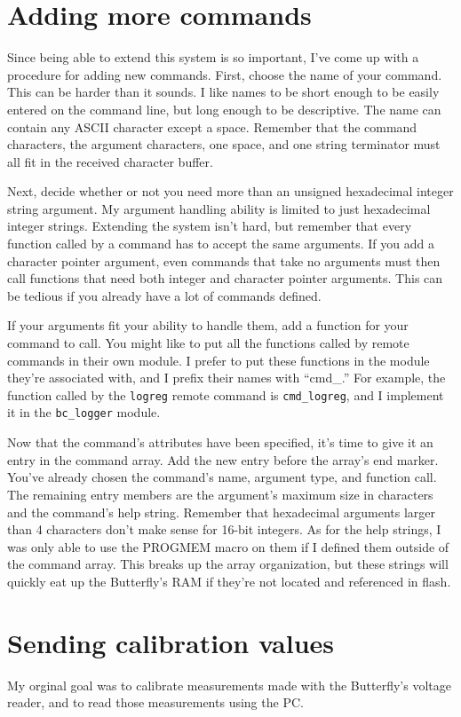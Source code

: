 \clearpage{}
\section{Adding more commands}
Since being able to extend this system is so important, I've come up with a procedure for adding new commands.  First, choose the name of your command.  This can be harder than it sounds.  I like names to be short enough to be easily entered on the command line, but long enough to be descriptive.  The name can contain any ASCII character except a space.  Remember that the command characters, the argument characters, one space, and one string terminator must all fit in the received character buffer.
    
Next, decide whether or not you need more than an unsigned hexadecimal integer string argument.  My argument handling ability is limited to just hexadecimal integer strings.  Extending the system isn't hard, but remember that every function called by a command has to accept the same arguments.  If you add a character pointer argument, even commands that take no arguments must then call functions that need both integer and character pointer arguments.  This can be tedious if you already have a lot of commands defined.

If your arguments fit your ability to handle them, add a function for your command to call.  You might like to put all the functions called by remote commands in their own module.  I prefer to put these functions in the module they're associated with, and I prefix their names with ``cmd\_.'' For example, the function called by the \texttt{logreg} remote command is \texttt{cmd\_logreg}, and I implement it in the \texttt{bc\_logger} module.

Now that the command's attributes have been specified, it's time to give it an entry in the command array.  Add the new entry before the array's end marker.  You've already chosen the command's name, argument type, and function call.  The remaining entry members are the argument's maximum size in characters and the command's help string.  Remember that hexadecimal arguments larger than 4 characters don't make sense for 16-bit integers.  As for the help strings, I was only able to use the PROGMEM macro on them if I defined them outside of the command array.  This breaks up the array organization, but these strings will quickly eat up the Butterfly's RAM if they're not located and referenced in flash.  

\clearpage{}
\section{Sending calibration values}
My orginal goal was to calibrate measurements made with the Butterfly's voltage reader, and to read those measurements using the PC.   


